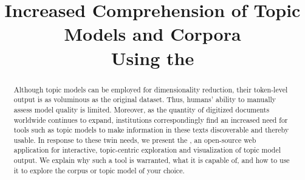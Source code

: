 \documentclass[11pt]{article}
\title{Increased Comprehension of Topic Models and Corpora\\ Using the \tool}
\begin{document}
\maketitle

\begin{abstract}
Although topic models can be employed for dimensionality reduction, their
token-level output is as voluminous as the original dataset. Thus, humans'
ability to manually assess model quality is limited. Moreover, as the quantity of
digitized documents worldwide continues to expand, institutions correspondingly
find an increased need for tools such as topic models to make information in
these texts discoverable and thereby usable. In response to these twin needs, we
present the \tool, an open-source web application for interactive, topic-centric
exploration and visualization of topic model output. We explain why such a tool
is warranted, what it is capable of, and how to use it to explore the corpus or
topic model of your choice.
\end{abstract}
\end{document}
